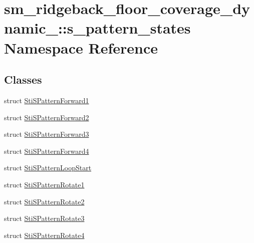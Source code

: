 \hypertarget{namespacesm__ridgeback__floor__coverage__dynamic__1_1_1s__pattern__states}{}\section{sm\+\_\+ridgeback\+\_\+floor\+\_\+coverage\+\_\+dynamic\+\_\+:\+:s\+\_\+pattern\+\_\+states Namespace Reference}
\label{namespacesm__ridgeback__floor__coverage__dynamic__1_1_1s__pattern__states}
\subsection*{Classes}
\begin{DoxyCompactItemize}
\item 
struct \hyperlink{structsm__ridgeback__floor__coverage__dynamic__1_1_1s__pattern__states_1_1StiSPatternForward1}{Sti\+S\+Pattern\+Forward1}
\item 
struct \hyperlink{structsm__ridgeback__floor__coverage__dynamic__1_1_1s__pattern__states_1_1StiSPatternForward2}{Sti\+S\+Pattern\+Forward2}
\item 
struct \hyperlink{structsm__ridgeback__floor__coverage__dynamic__1_1_1s__pattern__states_1_1StiSPatternForward3}{Sti\+S\+Pattern\+Forward3}
\item 
struct \hyperlink{structsm__ridgeback__floor__coverage__dynamic__1_1_1s__pattern__states_1_1StiSPatternForward4}{Sti\+S\+Pattern\+Forward4}
\item 
struct \hyperlink{structsm__ridgeback__floor__coverage__dynamic__1_1_1s__pattern__states_1_1StiSPatternLoopStart}{Sti\+S\+Pattern\+Loop\+Start}
\item 
struct \hyperlink{structsm__ridgeback__floor__coverage__dynamic__1_1_1s__pattern__states_1_1StiSPatternRotate1}{Sti\+S\+Pattern\+Rotate1}
\item 
struct \hyperlink{structsm__ridgeback__floor__coverage__dynamic__1_1_1s__pattern__states_1_1StiSPatternRotate2}{Sti\+S\+Pattern\+Rotate2}
\item 
struct \hyperlink{structsm__ridgeback__floor__coverage__dynamic__1_1_1s__pattern__states_1_1StiSPatternRotate3}{Sti\+S\+Pattern\+Rotate3}
\item 
struct \hyperlink{structsm__ridgeback__floor__coverage__dynamic__1_1_1s__pattern__states_1_1StiSPatternRotate4}{Sti\+S\+Pattern\+Rotate4}
\end{DoxyCompactItemize}
